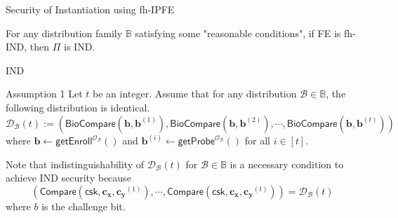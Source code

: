 \begin{frame}{Security of Instantiation using fh-IPFE}

{}

\begin{theorem}
{}
\end{theorem}


\begin{theorem}
{}
\end{theorem}


\begin{theorem}
	For any distribution family $\mathbb{B}$ satisfying some "reasonable conditions", if \textsf{FE} is fh-IND, then $\Pi$ is IND.
\end{theorem}

\end{frame}


\begin{frame}{IND}

\begin{block}{Assumption 1}
Let $t$ be an integer. Assume that for any distribution $\mathcal{B} \in \mathbb{B}$, the following distribution is identical.
\[
	\mathcal{D}_\mathcal{B}(t) := \left( \textsf{BioCompare}(\mathbf{b}, \mathbf{b}^{(1)}), \textsf{BioCompare}(\mathbf{b}, \mathbf{b}^{(2)}), \cdots, \textsf{BioCompare}(\mathbf{b}, \mathbf{b}^{(t)}) \right)
\]
where $\mathbf{b} \gets \textsf{getEnroll}^{\mathcal{O}_\mathcal{B}}()$ and $ \mathbf{b}^{(i)} \gets \textsf{getProbe}^{\mathcal{O}_\mathcal{B}}()$ for all $i \in [t]$.

\end{block}
\pause

Note that indistinguishability of $\mathcal{D}_\mathcal{B}(t)$ for $\mathcal{B} \in \mathbb{B}$ is a necessary condition to achieve IND security because
\[
	\left( \textsf{Compare}(\textsf{csk}, \mathbf{c_x}, \mathbf{c_y}^{(1)}), \cdots, \textsf{Compare}(\textsf{csk}, \mathbf{c_x}, \mathbf{c_y}^{(t)}) \right) = \mathcal{D}_\mathcal{B}(t)
\]
where $b$ is the challenge bit.


\end{frame}


